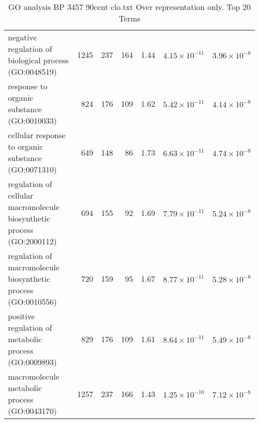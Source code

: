\begin{table}[ht]
\begin{adjustbox}{width=\textwidth}
\begin{tabular}{lrrrlrr}
  negative regulation of biological process (GO:0048519) & 1245 & 237 & 164 & 1.44 & $4.15 \times 10^{-11}$ & $3.96 \times 10^{-8}$ \\ 
  response to organic substance (GO:0010033) & 824 & 176 & 109 & 1.62 & $5.42 \times 10^{-11}$ & $4.14 \times 10^{-8}$ \\ 
  cellular response to organic substance (GO:0071310) & 649 & 148 & 86 & 1.73 & $6.63 \times 10^{-11}$ & $4.74 \times 10^{-8}$ \\ 
  regulation of cellular macromolecule biosynthetic process (GO:2000112) & 694 & 155 & 92 & 1.69 & $7.79 \times 10^{-11}$ & $5.24 \times 10^{-8}$ \\ 
  regulation of macromolecule biosynthetic process (GO:0010556) & 720 & 159 & 95 & 1.67 & $8.77 \times 10^{-11}$ & $5.28 \times 10^{-8}$ \\ 
  positive regulation of metabolic process (GO:0009893) & 829 & 176 & 109 & 1.61 & $8.64 \times 10^{-11}$ & $5.49 \times 10^{-8}$ \\ 
  macromolecule metabolic process (GO:0043170) & 1257 & 237 & 166 & 1.43 & $1.25 \times 10^{-10}$ & $7.12 \times 10^{-8}$ \\ 
   \hline
\end{tabular}
\end{adjustbox}
\caption{GO analysis BP 3457 90cent clo.txt Over representation only. Top 20 Terms} 
\label{tab:GO analysis BP 3457 90cent clo.txt Over representation only. Top 20 Terms}
\end{table}


